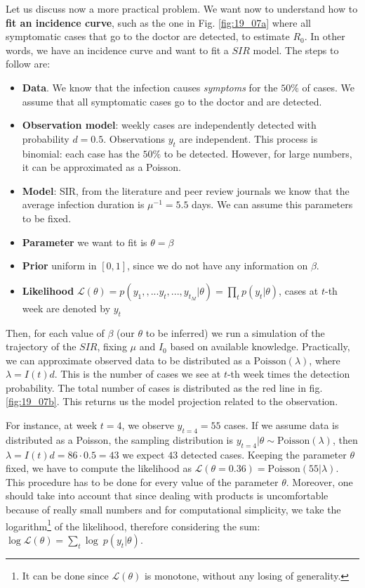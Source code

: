 \documentclass[../main/main.tex]{subfiles}
\begin{document}
Let us discuss now a more practical problem. We want now to understand how to \textbf{fit an incidence curve}, such as the one in Fig. \ref{fig:19_07a} where all symptomatic cases that go to the doctor are detected, to estimate $R_0$. In other words, we have an incidence curve and want to fit a $SIR$ model. The steps to follow are:
\begin{itemize}
    \item \textbf{Data}. We know that the infection causes \textit{symptoms} for the $50\%$ of cases. We assume that all symptomatic cases go to the doctor and are detected.
    \item \textbf{Observation model}: weekly cases are independently detected with probability $d = 0.5$. Observations $y_t$ are independent. This process is binomial: each case has the $50\%$ to be detected. However, for large numbers, it can be approximated as a Poisson.
    \item \textbf{Model}: SIR, from the literature and peer review journals we know that the average infection duration is $\mu^{-1} = 5.5$ days. We can assume this parameters to be fixed.
    \item \textbf{Parameter} we want to fit is $\theta = \beta$
    \item \textbf{Prior} uniform in $[0,1]$, since we do not have any information on $\beta$.
    \item \textbf{Likelihood} $\mathcal{L}(\theta) = p(y_1, ,...y_t,...,y_{t_M}|\theta) = \prod_t p(y_t|\theta)$, cases at $t$-th week are denoted by $y_t$
\end{itemize}

Then, for each value of $\beta$ (our $\theta$ to be inferred) we run a simulation of the trajectory of the $SIR$, fixing $\mu$ and $I_0$ based on available knowledge.
Practically, we can approximate observed data to be distributed as a $\text{Poisson}(\lambda)$, where $\lambda = I(t)d$. This is the number of cases we see at $t$-th week times the detection probability. The total number of cases is distributed as the red line in fig. \ref{fig:19_07b}. This returns us the model projection related to the observation.

For instance, at week $t = 4$, we observe $y_{t=4} = 55$ cases. If we assume data is distributed as a Poisson, the sampling distribution is $y_{t=4}|\theta \sim \text{Poisson}(\lambda)$, then $\lambda = I(t) d = 86\cdot 0.5 = 43$ we expect $43$ detected cases. Keeping the parameter $\theta$ fixed, we have to compute the likelihood as $\mathcal{L}(\theta = 0.36) = \text{Poisson}(55|\lambda)$. This procedure has to be done for every value of the parameter $\theta$. Moreover, one should take into account that since dealing with products is uncomfortable because of really small numbers and for computational simplicity, we take the logarithm\footnote{It can be done since $\mathcal{L}(\theta)$ is monotone, without any losing of generality.} of the likelihood, therefore considering the sum: $\log \mathcal{L}(\theta) = \sum_t \log\ p(y_t|\theta)$.
\end{document}
